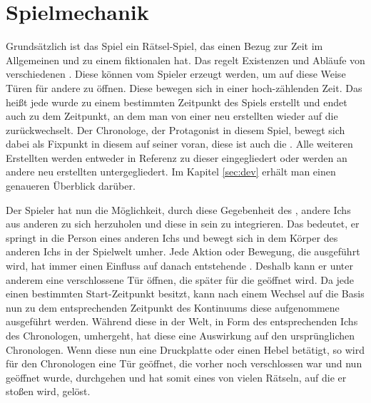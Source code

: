 \section{Spielmechanik}
Grundsätzlich ist das Spiel ein Rätsel-Spiel, das einen Bezug zur Zeit im Allgemeinen und zu einem fiktionalen  hat. Das  regelt Existenzen und Abläufe von verschiedenen . Diese  können vom Spieler erzeugt werden, um auf diese Weise Türen für andere  zu öffnen. Diese  bewegen sich in einer hoch-zählenden Zeit. Das heißt jede  wurde zu einem bestimmten Zeitpunkt des Spiels erstellt und endet auch zu dem Zeitpunkt, an dem man von einer neu erstellten  wieder auf die  zurückwechselt. Der Chronologe, der Protagonist in diesem Spiel, bewegt sich dabei als Fixpunkt in diesem  auf seiner  voran, diese ist auch die . Alle weiteren Erstellten  werden entweder in Referenz zu dieser  eingegliedert oder werden an andere neu erstellten  untergegliedert. Im Kapitel \ref{sec:dev}  erhält man einen genaueren Überblick darüber. 

Der Spieler hat nun die Möglichkeit, durch diese Gegebenheit des , andere Ichs aus anderen  zu sich herzuholen und diese in sein  zu integrieren. Das bedeutet, er springt in die Person eines anderen Ichs und bewegt sich in dem Körper des anderen Ichs in der Spielwelt umher. Jede Aktion oder Bewegung, die  ausgeführt wird, hat immer einen Einfluss auf danach entstehende . Deshalb kann er unter anderem eine verschlossene Tür öffnen, die später für die  geöffnet wird. Da jede  einen bestimmten Start-Zeitpunkt besitzt, kann nach einem Wechsel auf die Basis  nun zu dem entsprechenden Zeitpunkt des Kontinuums diese aufgenommene  ausgeführt werden. Während diese  in der Welt, in Form des entsprechenden Ichs des Chronologen, umhergeht, hat diese  eine Auswirkung auf den ursprünglichen Chronologen. Wenn diese  nun eine Druckplatte oder einen Hebel betätigt, so wird für den Chronologen eine Tür  geöffnet, die vorher noch verschlossen war und nun geöffnet wurde, durchgehen und hat somit eines von vielen Rätseln, auf die er stoßen wird, gelöst.


